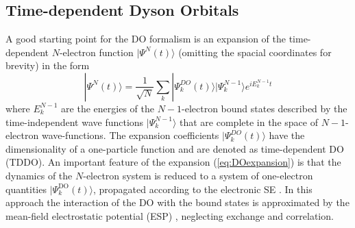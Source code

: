 \subsection{Time-dependent Dyson Orbitals}
A good starting point for the DO formalism is an expansion of the time-dependent $N$-electron function $|\Psi^N(t)\rangle$ (omitting the spacial coordinates for brevity) in the form
\begin{equation} \label{eq:DOexpansion}
| \Psi^N (t)\rangle =\frac{1}{\sqrt{N}} \sum_k |\Psi_k^{DO}(t)\rangle | \Psi^{N-1}_k \rangle e^{iE_k^{N-1}t}
\end{equation}
where $E_k^{N-1}$ are the energies of the $N-1$-electron bound states described by the time-independent wave functions $|\Psi_k^{N-1}\rangle$ that are complete in the space of $N-1$-electron wave-functions.
The expansion coefficients $|\Psi_k^{DO}(t)\rangle$ have the dimensionality of a one-particle function and are denoted as time-dependent DO (TDDO).
An important feature of the expansion (\ref{eq:DOexpansion}) is that the dynamics of the $N$-electron system is reduced to a system of one-electron quantities $|\Psi_k^\text{DO}(t)\rangle$, propagated according to the electronic SE \cite{TD-do}.
In this approach the interaction of the DO with the bound states is approximated by the mean-field electrostatic potential (ESP) \cite{TD-do}, neglecting exchange and correlation.

